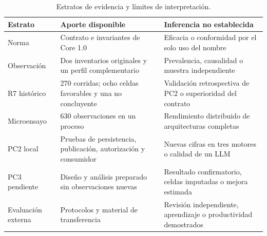 \begin{table}[htbp]\centering\small
\caption{Estratos de evidencia y límites de interpretación.}
\begin{tabularx}{\textwidth}{p{2.1cm}X X}\toprule
Estrato & Aporte disponible & Inferencia no establecida\\\midrule
Norma & Contrato e invariantes de Core 1.0 & Eficacia o conformidad por el solo uso del nombre\\
Observación & Dos inventarios originales y un perfil complementario & Prevalencia, causalidad o muestra independiente\\
R7 histórico & 270 corridas; ocho celdas favorables y una no concluyente & Validación retrospectiva de PC2 o superioridad del contrato\\
Microensayo & 630 observaciones en un proceso & Rendimiento distribuido de arquitecturas completas\\
PC2 local & Pruebas de persistencia, publicación, autorización y consumidor & Nuevas cifras en tres motores o calidad de un LLM\\
PC3 pendiente & Diseño y análisis preparado sin observaciones nuevas & Resultado confirmatorio, celdas imputadas o mejora estimada\\
Evaluación externa & Protocolos y material de transferencia & Revisión independiente, aprendizaje o productividad demostrados\\
\bottomrule\end{tabularx}\end{table}
